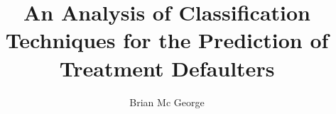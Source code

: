 \documentclass{sig-alternate-05-2015}
\begin{document}
	
	
	
	
	
	
	
	
	\title{An Analysis of Classification Techniques for the Prediction of Treatment Defaulters}
	
	\author{
		\alignauthor
		Brian Mc George\\
		\\
		\\
	}
	
\end{document}
